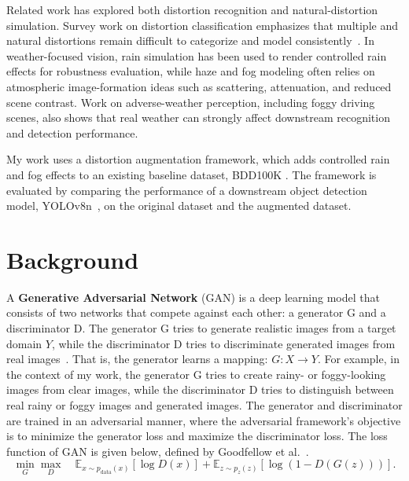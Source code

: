 \documentclass[10pt,letterpaper]{article}
\begin{document}
Related work has explored both distortion recognition and natural-distortion simulation. Survey
work on distortion classification emphasizes that multiple and natural distortions remain
difficult to categorize and model
consistently~\cite{muhammadaliqureshiDistortionClassificationComputer}. In weather-focused vision,
rain simulation has been used to render controlled rain effects for robustness evaluation, while
haze and fog modeling often relies on atmospheric image-formation ideas such as scattering,
attenuation, and reduced scene contrast. Work on adverse-weather perception, including foggy
driving scenes, also shows that real weather can strongly affect downstream recognition and
detection performance.


My work uses a distortion augmentation framework, which adds controlled rain and fog
effects to an existing baseline dataset, BDD100K \cite{wolfeBDD100KLargescaleDiverse}. The framework is evaluated by comparing the
performance of a downstream object detection model, YOLOv8n~\cite{WhatYOLOv8InDepth,ExploreUltralyticsYOLOv82023}, on the original dataset and the
augmented dataset.


\section{Background}

A \textbf{Generative Adversarial Network} (GAN) is a deep learning model that consists of two networks that 
compete against each other: a generator G and a discriminator D. The generator G tries to generate 
realistic images from a target domain $Y$, while the discriminator D tries
to discriminate generated images from real images~\cite{goodfellowGenerativeAdversarialNets}. That is, the generator learns a mapping: $G: X \rightarrow Y$.
For example, in the context of my work, the generator G tries to create rainy- or foggy-looking images from clear images,
while the discriminator D tries to distinguish between real rainy or foggy images and generated images. The generator and
discriminator are trained in an adversarial manner, where the adversarial framework's objective is to minimize the generator
loss and maximize the discriminator loss. The loss function of GAN is given below, defined by Goodfellow et al.~\cite{goodfellowGenerativeAdversarialNets}.
\[
\min_G \max_D \quad \mathbb{E}_{x \sim p_{\mathrm{data}}(x)}[\log D(x)] + \mathbb{E}_{z \sim p_z(z)}[\log(1 - D(G(z)))].
\]
\end{document}
